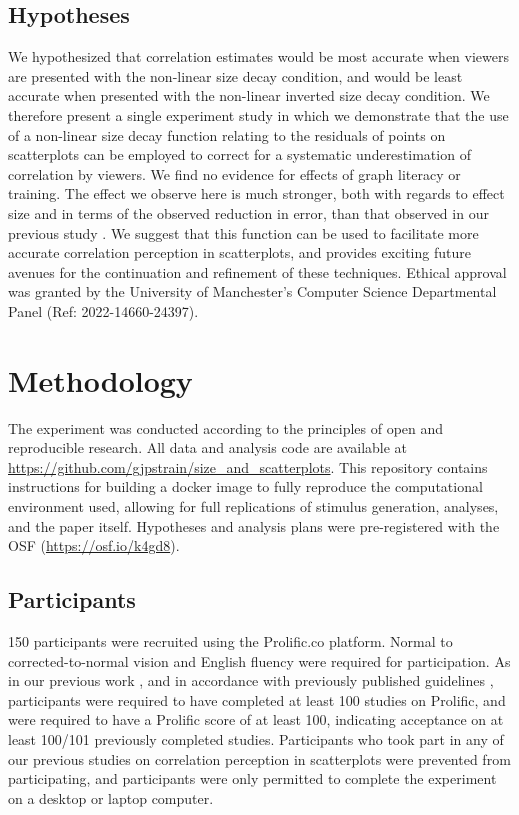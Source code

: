 \documentclass{vgtc}                          %
\begin{document}
\hypertarget{hypotheses}{%
\subsection{Hypotheses}\label{hypotheses}}

We hypothesized that correlation estimates would be most accurate when
viewers are presented with the non-linear size decay condition, and would be
least accurate when presented with the non-linear inverted size decay condition.
We therefore present a single experiment study in which we demonstrate that the use of
a non-linear size decay function relating to the residuals of points on scatterplots
can be employed to correct for a systematic underestimation of correlation by
viewers. We find no evidence for effects of graph literacy or training.
The effect we observe here is much stronger, both
with regards to effect size and in terms of the observed reduction in error, than that
observed in our previous study \cite{strain_2023}. We suggest that this
function can be used to facilitate more accurate correlation
perception in scatterplots, and provides exciting future avenues for the continuation
and refinement of these techniques. Ethical approval was granted by the University
of Manchester's Computer Science Departmental Panel (Ref: 2022-14660-24397).

\hypertarget{methodology}{%
\section{Methodology}\label{methodology}}

The experiment was conducted according to the principles of open and reproducible research.
All data and analysis code are available at \url{https://github.com/gjpstrain/size_and_scatterplots}.
This repository contains instructions for building a docker image to fully
reproduce the computational environment used, allowing for full replications
of stimulus generation, analyses, and the paper itself. Hypotheses and analysis plans were
pre-registered with the OSF (\url{https://osf.io/k4gd8}).

\hypertarget{participants}{%
\subsection{Participants}\label{participants}}

150 participants were recruited using the Prolific.co platform. Normal to
corrected-to-normal vision and English fluency were required for participation. As in our previous work
\cite{strain_2023}, and in accordance with previously published guidelines \cite{peer_2021},
participants were required to have completed at least 100 studies on Prolific, and were
required to have a Prolific score of at least 100, indicating acceptance on at least
100/101 previously completed studies. Participants who took part in any of our
previous studies on correlation perception in scatterplots
were prevented from participating, and participants were only
permitted to complete the experiment on a desktop or laptop computer.
\end{document}
